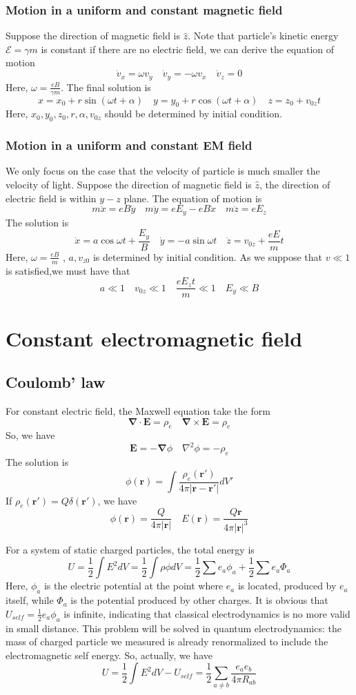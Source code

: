 \documentclass[cyan]{elegantnote}
\begin{document}
\subsubsection{Motion in a uniform and constant magnetic field}
Suppose the direction of magnetic field is $\hat{z}$. Note that particle's kinetic energy $\mathcal{E} = \gamma m$ is constant if there are no electric field, we can derive the equation of motion
\[\dot{v}_x = \omega v_y \quad \dot{v}_y = -\omega v_x \quad \dot{v}_z = 0\]
Here, $\omega = \frac{eB}{\gamma m}$. The final solution is
\[x = x_0 + r\sin(\omega t + \alpha) \quad y = y_0 + r\cos(\omega t + \alpha) \quad z = z_0 + v_{0z}t\]
Here, $x_0,y_0,z_0,r,\alpha,v_{0z}$ should be determined by initial condition.
\subsubsection{Motion in a uniform and constant EM field}
We only focus on the case that the velocity of particle is much smaller the velocity of light. Suppose the direction of magnetic field is $\hat{z}$, the direction of electric field is within $y-z$ plane. The equation of motion is
\[m\ddot{x} = eB\dot{y} \quad m\ddot{y} =eE_y - eB\dot{x} \quad m\ddot{z}=eE_z\]
The solution is
\[\dot{x} = a \cos \omega t + \frac{E_y}{B} \quad \dot{y} = -a\sin \omega t \quad \dot{z} = v_{0z} + \frac{eE}{m}t\]
Here, $\omega = \frac{eB}{m}$ , $a,v_{z0}$ is determined by initial condition. As we suppose that $v \ll 1$ is satisfied,we must have that
\[a \ll 1 \quad v_{0z} \ll 1 \quad \frac{eE_z t}{m} \ll 1 \quad E_y \ll B\]

\section{Constant electromagnetic field}
\subsection{Coulomb' law}
For constant electric field, the Maxwell equation take the form 
\[\bm{\nabla} \cdot \bm{E} = \rho_e \quad \bm{\nabla} \times \bm{E} = \rho_e\]
So, we have
\[\bm{E} = -\bm{\nabla} \phi \quad \nabla^2 \phi = -\rho_e \]
The solution is
\[\phi(\bm{r}) = \int  \frac{\rho_e(\bm{r}')}{4\pi|\bm{r}-\bm{r}'|} dV'\]
If $\rho_e(\bm{r}') = Q \delta(\bm{r}')$, we have
\[\phi(\bm{r}) =  \frac{Q}{4\pi|\bm{r}|} \quad E(\bm{r}) = \frac{Q\bm{r}}{4\pi|\bm{r}|^3}\]

For a system of static charged particles, the total energy is
\[U = \frac{1}{2}\int E^2 dV = \frac{1}{2} \int \rho \phi dV = \frac{1}{2} \sum e_a \phi_a + \frac{1}{2}\sum e_a \Phi_a\]
Here, $\phi_a$ is the electric potential at the point where $e_a$ is located, produced by $e_a$ itself, while  $\Phi_a$ is the potential produced by other charges. It is obvious that $U_{self} = \frac{1}{2} e_a \phi_a$ is infinite, indicating that classical electrodynamics is no more valid in small distance. This problem will be solved in quantum electrodynamics: the mass of charged particle we measured is already renormalized to include the electromagnetic self energy. So, actually, we have
\[U = \frac{1}{2}\int E^2 dV - U_{self} = \frac{1}{2}\sum_{a \ne b} \frac{e_a e_b}{4\pi R_{ab}}\]
\end{document}
